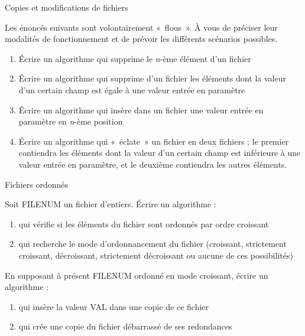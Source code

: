 \begin{Exercice}{Copies et modifications de fichiers}
	
	Les énoncés suivants sont volontairement «~flous~». À vous de préciser
	leur modalités de fonctionnement et de prévoir les différents scénarios
	possibles.
	
	\begin{enumerate}[label=\alph*)]
		\item 
			Écrire un algorithme qui supprime le \textit{n}{}-ème élément d’un
			fichier
		\item 
			Écrire un algorithme qui supprime d’un fichier les éléments dont la
			valeur d’un certain champ est égale à une valeur entrée en paramètre 
		\item 
			Écrire un algorithme qui insère dans un fichier une valeur entrée en
			paramètre en \textit{n}{}-ème position
		\item 
			Écrire un algorithme qui «~éclate~» un fichier en deux fichiers ; le
			premier contiendra les éléments dont la valeur d’un certain champ est
			inférieure à une valeur entrée en paramètre, et le deuxième contiendra
			les autres éléments.
	\end{enumerate}
\end{Exercice}

\begin{Exercice}{Fichiers ordonnés}

	Soit FILENUM un fichier d’entiers. Écrire un algorithme :

	\begin{enumerate}[label=\alph*)]
		\item 
			qui vérifie si les éléments du fichier sont ordonnés par ordre
			croissant
		\item 
			qui recherche le mode d’ordonnancement du fichier (croissant,
			strictement croissant, décroissant, strictement décroissant ou aucune
			de ces possibilités)
	\end{enumerate}
	
	En supposant à présent FILENUM ordonné en mode croissant, écrire un
	algorithme :

	\begin{enumerate}[label=\alph*)]
		\item 
			qui insère la valeur VAL dans une copie de ce fichier
		\item 
			qui crée une copie du fichier débarrassé de ses redondances
	\end{enumerate}
\end{Exercice}


